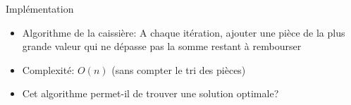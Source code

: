 \begin{frame}{Implémentation}

\begin{itemize}
\item Algorithme de la caissière: A chaque itération, ajouter une
  pièce de la plus grande valeur qui ne dépasse pas la somme restant à rembourser
\end{itemize}

{\small
\begin{center}
\end{center}
}

\begin{itemize}
\item Complexité: $O(n)$ (sans compter le tri des pièces)
\item Cet algorithme permet-il de trouver une solution optimale?
\end{itemize}

\end{frame}

